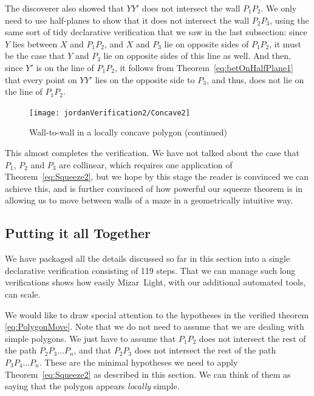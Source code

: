 The discoverer also showed that $YY'$ does not intersect the wall $P_1P_2$. We only need to use half-planes to show that it does not intersect the wall $P_2P_3$, using the same sort of tidy declarative verification that we saw in the last subsection: since $Y$ lies between $X$ and $P_1P_2$, and $X$ and $P_3$ lie on opposite sides of $P_1P_2$, it must be the case that $Y$ and $P_3$ lie on opposite sides of this line as well. And then, since $Y'$ is on the line of $P_1P_2$, it follows from Theorem~\ref{eq:betOnHalfPlane1} that every point on $YY'$ lies on the opposite side to $P_3$, and thus, does not lie on the line of $P_1P_2$. 

\begin{figure}
\centering\texttt{[image: jordanVerification2/Concave2]}
\caption{Wall-to-wall in a locally concave polygon (continued)}
\label{fig:Concave2}
\end{figure}

This almost completes the verification. We have not talked about the case that $P_1$, $P_2$ and $P_3$ are collinear, which requires one application of Theorem~\ref{eq:Squeeze2}, but we hope by this stage the reader is convinced we can achieve this, and is further convinced of how powerful our squeeze theorem is in allowing us to move between walls of a maze in a geometrically intuitive way.

\subsection{Putting it all Together}
We have packaged all the details discussed so far in this section into a single declarative verification consisting of 119 steps. That we can manage such long verifications shows how easily Mizar~Light, with our additional automated tools, can scale.

We would like to draw special attention to the hypotheses in the verified theorem \eqref{eq:PolygonMove}. Note that we do not need to assume that we are dealing with simple polygons. We just have to assume that $P_1P_2$ does not intersect the rest of the path $P_2P_3\ldots P_n$, and that $P_2P_3$ does not intersect the rest of the path $P_3P_4\ldots P_n$. These are the minimal hypotheses we need to apply Theorem~\ref{eq:Squeeze2} as described in this section. We can think of them as saying that the polygon appears \emph{locally} simple.

